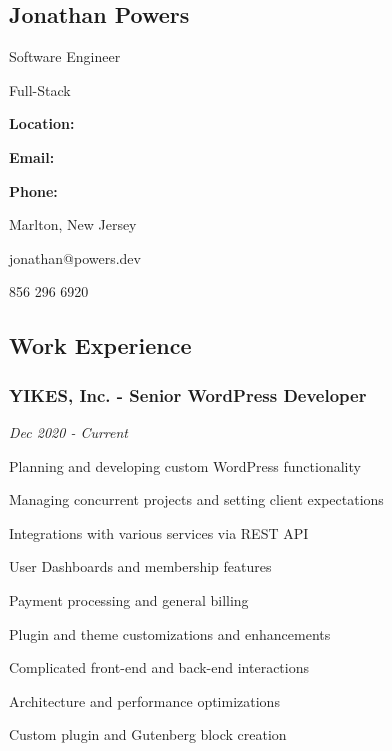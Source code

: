 \documentclass{article}
\newenvironment{narrow_list}{
	\begin{itemize}
		\setlength{\itemsep}{0pt}
		\setlength{\parskip}{-1pt}
		\setlength{\parsep}{0pt}
	}{\end{itemize}
}
\begin{document}

	\begin{multicols}{2}

		\section*{Jonathan Powers}

		Software Engineer

		Full-Stack

	\columnbreak

		\vspace{3mm}

		\setlength{\columnsep}{-4cm}

		\begin{multicols}{2}

			\textbf{Location:} 

			\textbf{Email:} 

			\textbf{Phone:} 

		\columnbreak

			Marlton, New Jersey

			jonathan@powers.dev

			856 296 6920
		
		\end{multicols}

		\vspace{3mm}

	\end{multicols}



	\subsection*{Work Experience}


	\vspace{2mm}

	\subsubsection*{YIKES, Inc. - Senior WordPress Developer}

	\vspace{-1.5mm}

	\textit{Dec 2020 - Current}

	Planning and developing custom WordPress functionality

	\begin{narrow_list}
		\item Managing concurrent projects and setting client expectations
		\item Integrations with various services via REST API
		\item User Dashboards and membership features
		\item Payment processing and general billing
		\item Plugin and theme customizations and enhancements
		\item Complicated front-end and back-end interactions
		\item Architecture and performance optimizations
		\item Custom plugin and Gutenberg block creation
	\end{narrow_list}
\end{document}
